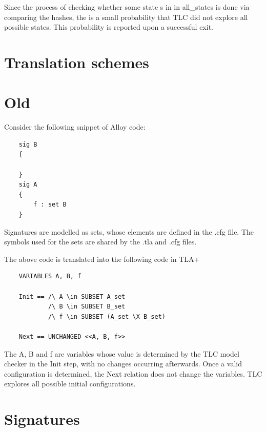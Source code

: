 Since the process of checking whether some state s in in all\_states is done via comparing the hashes, the is a small probability that TLC did not explore all possible states. This probability is reported upon a successful exit.


\section{Translation schemes}


\section{Old}




Consider the following snippet of Alloy code:

\begin{lstlisting}
	sig B
	{

	}
	sig A
	{
		f : set B
	}
\end{lstlisting}

Signatures are modelled as sets, whose elements are defined in the .cfg file. The symbols used for the sets are shared by the .tla and .cfg files. 

The above code is translated into the following code in TLA+

\begin{verbatim}
	VARIABLES A, B, f

	Init == /\ A \in SUBSET A_set
			/\ B \in SUBSET B_set
			/\ f \in SUBSET (A_set \X B_set)

	Next == UNCHANGED <<A, B, f>>
\end{verbatim}

The A, B and f are variables whose value is determined by the TLC model checker in the Init step, with no changes occurring afterwards. Once a valid configuration is determined, the Next relation does not change the variables. TLC explores all possible initial configurations.

\section{Signatures}

